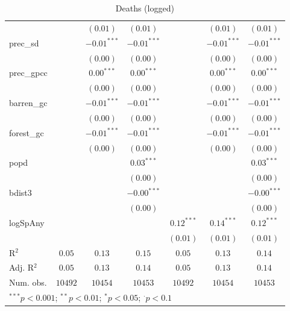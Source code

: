 \begin{sidewaystable}
\begin{center}
{\begin{tabular}{l c c c c c c}
                &               & $(0.01)$      & $(0.01)$      &               & $(0.01)$      & $(0.01)$      \\
prec\_sd        &               & $-0.01^{***}$ & $-0.01^{***}$ &               & $-0.01^{***}$ & $-0.01^{***}$ \\
                &               & $(0.00)$      & $(0.00)$      &               & $(0.00)$      & $(0.00)$      \\
prec\_gpcc      &               & $0.00^{***}$  & $0.00^{***}$  &               & $0.00^{***}$  & $0.00^{***}$  \\
                &               & $(0.00)$      & $(0.00)$      &               & $(0.00)$      & $(0.00)$      \\
barren\_gc      &               & $-0.01^{***}$ & $-0.01^{***}$ &               & $-0.01^{***}$ & $-0.01^{***}$ \\
                &               & $(0.00)$      & $(0.00)$      &               & $(0.00)$      & $(0.00)$      \\
forest\_gc      &               & $-0.01^{***}$ & $-0.01^{***}$ &               & $-0.01^{***}$ & $-0.01^{***}$ \\
                &               & $(0.00)$      & $(0.00)$      &               & $(0.00)$      & $(0.00)$      \\
popd            &               &               & $0.03^{***}$  &               &               & $0.03^{***}$  \\
                &               &               & $(0.00)$      &               &               & $(0.00)$      \\
bdist3          &               &               & $-0.00^{***}$ &               &               & $-0.00^{***}$ \\
                &               &               & $(0.00)$      &               &               & $(0.00)$      \\
logSpAny        &               &               &               & $0.12^{***}$  & $0.14^{***}$  & $0.12^{***}$  \\
                &               &               &               & $(0.01)$      & $(0.01)$      & $(0.01)$      \\
\hline
R$^2$           & $0.05$        & $0.13$        & $0.15$        & $0.05$        & $0.13$        & $0.14$        \\
Adj. R$^2$      & $0.05$        & $0.13$        & $0.14$        & $0.05$        & $0.13$        & $0.14$        \\
Num. obs.       & $10492$       & $10454$       & $10453$       & $10492$       & $10454$       & $10453$       \\
\hline
\multicolumn{7}{l}{\scriptsize{$^{***}p<0.001$; $^{**}p<0.01$; $^{*}p<0.05$; $^{\cdot}p<0.1$}}
\end{tabular}
}
\caption{Deaths (logged)}
\label{logDeaths}
\end{center}
\end{sidewaystable}
